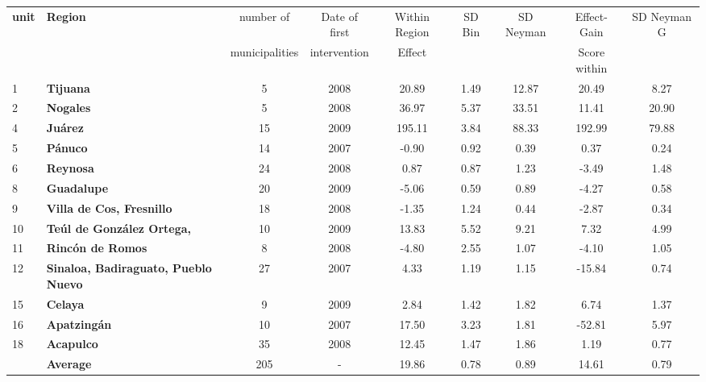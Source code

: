 \documentclass{article}[11 pt]
\begin{document}
\begin{table}[ht]
\begin{center}
\begin{tabular}{llccccccc}
  \hline
 \textbf{unit}& \textbf{Region}& number of& Date of first & Within Region & SD Bin& SD Neyman &Effect- Gain&SD Neyman G\\
 && municipalities& intervention& Effect&&& Score within&\\
  \hline
1&\textbf{Tijuana} &   5 & 2008 &20.89 & 1.49 & 12.87&20.49 & 8.27 \\  
2&		  \textbf{Nogales} &   5 & 2008 &36.97 & 5.37 & 33.51& 11.41 & 20.90 \\
4&		  \textbf{Ju\'{a}rez} &  15 & 2009 & 195.11 & 3.84 & 88.33 & 192.99 & 79.88 \\   
5&		  \textbf{P\'{a}nuco} &  14 & 2007 &  -0.90 & 0.92 & 0.39& 0.37 & 0.24 \\
6&		  \textbf{Reynosa} &  24 & 2008 &  0.87 & 0.87 & 1.23  & -3.49 & 1.48 \\  
8&		  \textbf{Guadalupe} &  20 & 2009 &  -5.06 & 0.59 & 0.89 & -4.27 & 0.58 \\  
9&		  \textbf{Villa de Cos, Fresnillo} &  18 & 2008 &-1.35 & 1.24 & 0.44 & -2.87 & 0.34 \\  
10&		\textbf{Te\'{u}l de Gonz\'{a}lez Ortega,} &10 & 2009&13.83 & 5.52 & 9.21& 7.32 & 4.99 \\ 
11&		\textbf{Rinc\'{o}n de Romos} & 8 & 2008&-4.80 & 2.55 & 1.07& -4.10 & 1.05\\
12&		\textbf{Sinaloa, Badiraguato, Pueblo Nuevo} &27 & 2007& 4.33 & 1.19 & 1.15 & -15.84 & 0.74 \\ 
15&		\textbf{Celaya} &9 & 2009  &2.84 & 1.42 & 1.82& 6.74 & 1.37 \\ 
16&		\textbf{Apatzing\'{a}n} &10 & 2007 &17.50 & 3.23 & 1.81 &-52.81 & 5.97 \\  
18&		\textbf{Acapulco} &35 & 2008 & 12.45 & 1.47 & 1.86 & 1.19 & 0.77 \\ 
&		 \textbf{Average}& 205& - &19.86& 0.78&  0.89&14.61& 0.79\\
\hline
\end{tabular}
\end{center}
\end{table}
	
\end{document}
